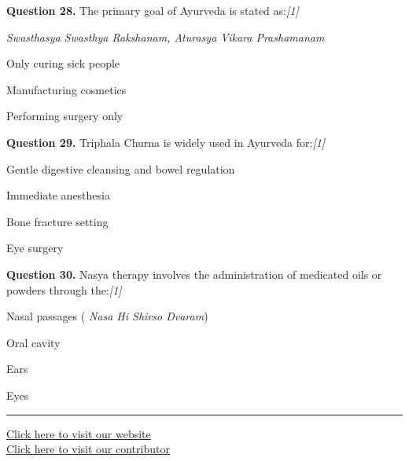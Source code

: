 \documentclass[11pt,a4paper]{article}
\newcommand{\pts}[1]{\hfill   \textit{[#1]}}
\begin{document}
\medskip




\noindent   \textbf{Question 28.} The primary goal of Ayurveda is stated as:\pts{1}

\begin{parts}
  \item   \textit{Swasthasya Swasthya Rakshanam, Aturasya Vikara Prashamanam}
  \item Only curing sick people
  \item Manufacturing cosmetics
  \item Performing surgery only
\end{parts}

\medskip




\noindent   \textbf{Question 29.} Triphala Churna is widely used in Ayurveda for:\pts{1}

\begin{parts}
  \item Gentle digestive cleansing and bowel regulation
  \item Immediate anesthesia
  \item Bone fracture setting
  \item Eye surgery
\end{parts}

\medskip




\noindent   \textbf{Question 30.} Nasya therapy involves the administration of medicated oils or powders through the:\pts{1}

\begin{parts}
  \item Nasal passages (   \textit{Nasa Hi Shirso Dvaram})
  \item Oral cavity
  \item Ears
  \item Eyes
\end{parts}

\vfill
\rule{\linewidth}{0.4pt}

\begin{center}\small
\href{https://bhu-exam.vercel.app/}{Click here to visit our website}\\[4pt]
\href{https://me-aryan.vercel.app/}{Click here to visit our contributor}
\end{center}
\end{document}
